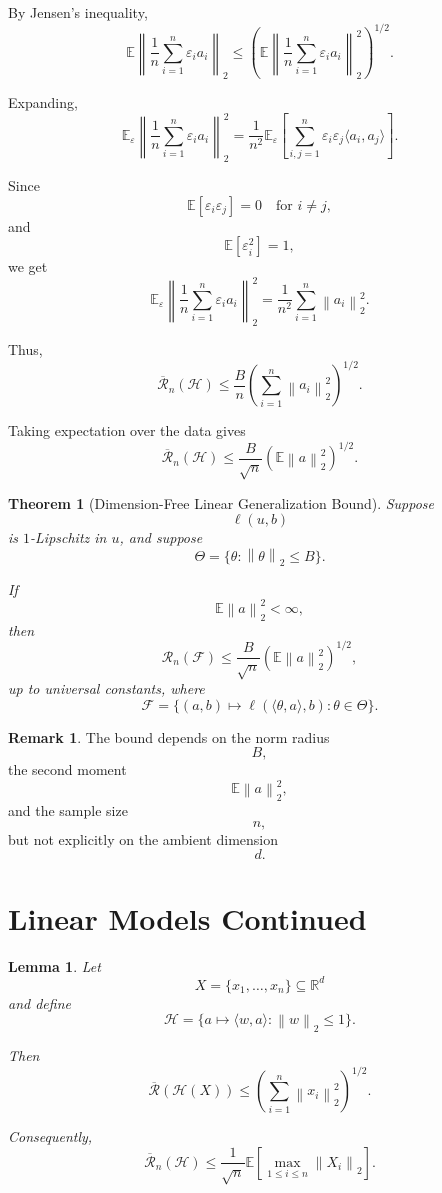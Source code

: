 \documentclass[12pt,oneside]{book}
\numberwithin{equation}{section}
\theoremstyle{definition}
\newtheorem{remark}{Remark}[section]
\theoremstyle{plain}
\newtheorem{theorem}{Theorem}[section]
\newtheorem{lemma}{Lemma}[section]
\theoremstyle{remark}
\newcommand{\R}{\mathbb{R}}
\newcommand{\E}{\mathbb{E}}
\newcommand{\norm}[1]{\left\lVert #1 \right\rVert}
\begin{document}
By Jensen's inequality,
\[
\E
\left\|
\frac{1}{n}
\sum_{i=1}^n
\varepsilon_i a_i
\right\|_2
\leq
\left(
\E
\left\|
\frac{1}{n}
\sum_{i=1}^n
\varepsilon_i a_i
\right\|_2^2
\right)^{1/2}.
\]

Expanding,
\[
\E_\varepsilon
\left\|
\frac{1}{n}
\sum_{i=1}^n
\varepsilon_i a_i
\right\|_2^2
=
\frac{1}{n^2}
\E_\varepsilon
\left[
\sum_{i,j=1}^n
\varepsilon_i\varepsilon_j
\langle a_i,a_j\rangle
\right].
\]

Since
\[
\E[\varepsilon_i\varepsilon_j]=0
\quad\text{for } i\neq j,
\]
and
\[
\E[\varepsilon_i^2]=1,
\]
we get
\[
\E_\varepsilon
\left\|
\frac{1}{n}
\sum_{i=1}^n
\varepsilon_i a_i
\right\|_2^2
=
\frac{1}{n^2}
\sum_{i=1}^n
\norm{a_i}_2^2.
\]

Thus,
\[
\overline{\mathcal{R}}_n(\mathcal{H})
\leq
\frac{B}{n}
\left(
\sum_{i=1}^n
\norm{a_i}_2^2
\right)^{1/2}.
\]

Taking expectation over the data gives
\[
\overline{\mathcal{R}}_n(\mathcal{H})
\leq
\frac{B}{\sqrt{n}}
\left(
\E\norm{a}_2^2
\right)^{1/2}.
\]

\begin{theorem}[Dimension-Free Linear Generalization Bound]
Suppose
\[
\ell(u,b)
\]
is $1$-Lipschitz in $u$, and suppose
\[
\Theta=\{\theta:\norm{\theta}_2\leq B\}.
\]

If
\[
\E\norm{a}_2^2<\infty,
\]
then
\[
\mathcal{R}_n(\mathcal{F})
\leq
\frac{B}{\sqrt{n}}
\left(
\E\norm{a}_2^2
\right)^{1/2},
\]
up to universal constants, where
\[
\mathcal{F}
=
\{(a,b)\mapsto \ell(\langle \theta,a\rangle,b):\theta\in\Theta\}.
\]
\end{theorem}

\begin{remark}
The bound depends on the norm radius
\[
B,
\]
the second moment
\[
\E\norm{a}_2^2,
\]
and the sample size
\[
n,
\]
but not explicitly on the ambient dimension
\[
d.
\]
\end{remark}

\section{Linear Models Continued}

\begin{lemma}
Let
\[
X=\{x_1,\dots,x_n\}\subseteq\R^d
\]
and define
\[
\mathcal{H}
=
\{a\mapsto \langle w,a\rangle:\norm{w}_2\leq 1\}.
\]

Then
\[
\overline{\mathcal{R}}(\mathcal{H}(X))
\leq
\left(
\sum_{i=1}^n \norm{x_i}_2^2
\right)^{1/2}.
\]

Consequently,
\[
\overline{\mathcal{R}}_n(\mathcal{H})
\leq
\frac{1}{\sqrt{n}}
\E\left[
\max_{1\leq i\leq n}\norm{X_i}_2
\right].
\]
\end{lemma}
\end{document}
